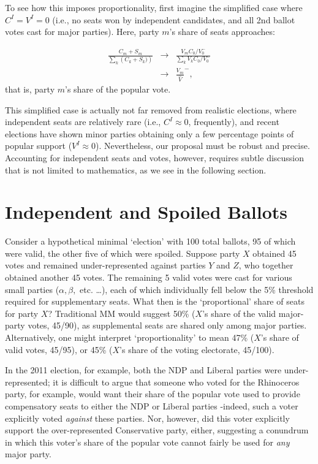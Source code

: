To see how this imposes proportionality, first imagine the simplified case where $C^I=V^I=0$ (i.e., no seats won by independent candidates, and all 2nd ballot votes cast for major parties). Here, party $m$'s share of seats approaches:

\begin{align}
\label{eq:seatshare}
\frac{C_m+S_m}{ \sum\limits_k\left( C_k+S_k) \right)} &\to& \frac{V_m C_0/V_0^-}{ \sum\limits_k V_k C_0/V_0^-} \\
&\to& \frac{V_m}{\hat{V}}^-,
\end{align}
that is, party $m$'s share of the popular vote. 

This simplified case is actually not far removed from realistic elections, where independent seats are relatively rare (i.e., $C^I\approx0$, frequently), and recent elections have shown minor parties obtaining only a few percentage points of popular support ($V^I \approx 0$). 
Nevertheless, our proposal must be robust and precise. Accounting for independent seats and votes, however, requires subtle discussion that is not limited to mathematics, as we see in the following section. 


\section{Independent and Spoiled Ballots}
\label{sec:outliers}
Consider a hypothetical minimal `election' with 100 total ballots, 95 of which were valid, the other five of which were spoiled. Suppose party $X$ obtained 45 votes and remained under-represented against parties $Y$ and $Z$, who together obtained another 45 votes. The remaining 5 valid votes were cast for various small parties ($\alpha,\beta,$ etc. \ldots), each of which individually fell below the 5\% threshold required for supplementary seats.
What then is the `proportional' share of seats for party $X$?
Traditional MM would suggest 50\% ($X$'s share of the valid major-party votes, 45/90), as supplemental seats are shared only among major parties. Alternatively, one might interpret `proportionality' to mean 47\% ($X$'s share of valid votes, 45/95), or 45\% ($X$'s share of the voting electorate, 45/100). 


In the 2011 election, for example, both the NDP and Liberal parties were under-represented; it is difficult to argue that someone who voted for the Rhinoceros party, for example, would want their share of the popular vote used to provide compensatory seats to either the NDP or Liberal parties \--indeed, such a voter explicitly voted \emph{against} these parties. 
Nor, however, did this voter explicitly support the over-represented Conservative party, either, suggesting a conundrum in which this voter's share of the popular vote cannot fairly be used for \emph{any} major party. 

